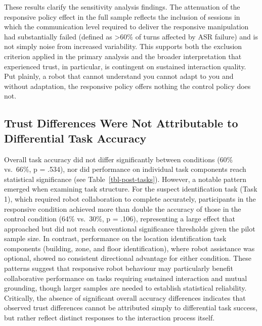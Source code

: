 \documentclass[
  authoryear,
  doubleblind,
  3p]{elsarticle}
\begin{document}
These results clarify the sensitivity analysis findings. The attenuation
of the responsive policy effect in the full sample reflects the
inclusion of sessions in which the communication level required to
deliver the responsive manipulation had substantially failed (defined as
\textgreater60\% of turns affected by ASR failure) and is not simply
noise from increased variability. This supports both the exclusion
criterion applied in the primary analysis and the broader interpretation
that experienced trust, in particular, is contingent on sustained
interaction quality. Put plainly, a robot that cannot understand you
cannot adapt to you and without adaptation, the responsive policy offers
nothing the control policy does not.

\subsection{Trust Differences Were Not Attributable to Differential Task
Accuracy}\label{trust-differences-were-not-attributable-to-differential-task-accuracy}

Overall task accuracy did not differ significantly between conditions
(60\% vs.~66\%, p = .534), nor did performance on individual task
components reach statistical significance (see
Table~\ref{tbl-post-tasks}). However, a notable pattern emerged when
examining task structure. For the suspect identification task (Task 1),
which required robot collaboration to complete accurately, participants
in the responsive condition achieved more than double the accuracy of
those in the control condition (64\% vs.~30\%, p = .106), representing a
large effect that approached but did not reach conventional significance
thresholds given the pilot sample size. In contrast, performance on the
location identification task components (building, zone, and floor
identification), where robot assistance was optional, showed no
consistent directional advantage for either condition. These patterns
suggest that responsive robot behaviour may particularly benefit
collaborative performance on tasks requiring sustained interaction and
mutual grounding, though larger samples are needed to establish
statistical reliability. Critically, the absence of significant overall
accuracy differences indicates that observed trust differences cannot be
attributed simply to differential task success, but rather reflect
distinct responses to the interaction process itself.
\end{document}
